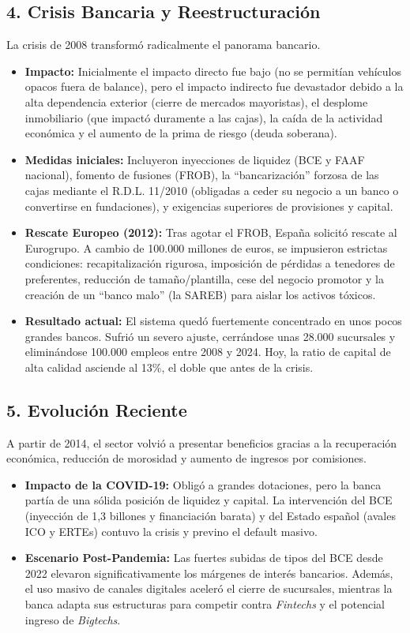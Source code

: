 \subsection*{4. Crisis Bancaria y Reestructuración}

La crisis de 2008 transformó radicalmente el panorama bancario.

\begin{itemize}
  \item \textbf{Impacto:} Inicialmente el impacto directo fue bajo (no se permitían vehículos opacos fuera de balance), pero el impacto indirecto fue devastador debido a la alta dependencia exterior (cierre de mercados mayoristas), el desplome inmobiliario (que impactó duramente a las cajas), la caída de la actividad económica y el aumento de la prima de riesgo (deuda soberana).
  \item \textbf{Medidas iniciales:} Incluyeron inyecciones de liquidez (BCE y FAAF nacional), fomento de fusiones (FROB), la ``bancarización'' forzosa de las cajas mediante el R.D.L. 11/2010 (obligadas a ceder su negocio a un banco o convertirse en fundaciones), y exigencias superiores de provisiones y capital.
  \item \textbf{Rescate Europeo (2012):} Tras agotar el FROB, España solicitó rescate al Eurogrupo. A cambio de 100.000 millones de euros, se impusieron estrictas condiciones: recapitalización rigurosa, imposición de pérdidas a tenedores de preferentes, reducción de tamaño/plantilla, cese del negocio promotor y la creación de un ``banco malo'' (la SAREB) para aislar los activos tóxicos.
  \item \textbf{Resultado actual:} El sistema quedó fuertemente concentrado en unos pocos grandes bancos. Sufrió un severo ajuste, cerrándose unas 28.000 sucursales y eliminándose 100.000 empleos entre 2008 y 2024. Hoy, la ratio de capital de alta calidad asciende al 13\%, el doble que antes de la crisis.
\end{itemize}

\subsection*{5. Evolución Reciente}

A partir de 2014, el sector volvió a presentar beneficios gracias a la recuperación económica, reducción de morosidad y aumento de ingresos por comisiones.

\begin{itemize}
  \item \textbf{Impacto de la COVID-19:} Obligó a grandes dotaciones, pero la banca partía de una sólida posición de liquidez y capital. La intervención del BCE (inyección de 1,3 billones y financiación barata) y del Estado español (avales ICO y ERTEs) contuvo la crisis y previno el default masivo.
  \item \textbf{Escenario Post-Pandemia:} Las fuertes subidas de tipos del BCE desde 2022 elevaron significativamente los márgenes de interés bancarios. Además, el uso masivo de canales digitales aceleró el cierre de sucursales, mientras la banca adapta sus estructuras para competir contra \textit{Fintechs} y el potencial ingreso de \textit{Bigtechs}.
\end{itemize}

